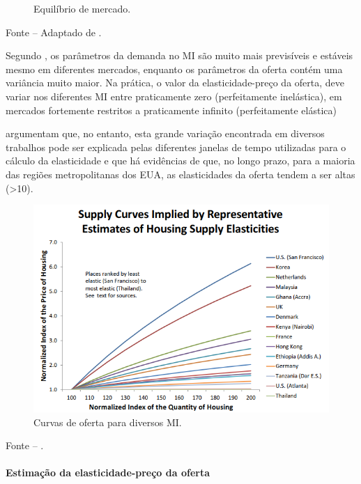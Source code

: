 \documentclass[
	12pt,				%
	oneside,			%
	a4paper,			%
	chapter=TITLE,		%
	section=TITLE,		%
	english,			%
	brazil				%
	]{abntex2}
\newcommand{\bcenter}{\begin{center}}
\newcommand{\ecenter}{\end{center}}
\begin{document}
\begin{refsection}
\begin{figure}[H]
{}

\caption{Equilíbrio de mercado.}\label{fig:casosEspeciais}
\end{figure}
\bcenter

\small Fonte -- Adaptado de \textcite[p.~312]{varian}.
\ecenter

Segundo \textcite[p.~17]{Malpezzi2002TheRO}, os parâmetros da demanda no \gls{MI} são
muito mais previsíveis e estáveis mesmo em diferentes mercados, enquanto os
parâmetros da oferta contém uma variância muito maior. Na prática, o valor da
elasticidade-preço da oferta, deve variar nos diferentes \gls{MI} entre
praticamente zero (perfeitamente inelástica), em mercados fortemente restritos
\autocite{malaysia} a praticamente infinito (perfeitamente elástica)

\textcite{supplyelasticity} argumentam que, no entanto, esta
grande variação encontrada em diversos trabalhos pode ser explicada pelas
diferentes janelas de tempo utilizadas para o cálculo da elasticidade e que há
evidências de que, no longo prazo, para a maioria das regiões metropolitanas dos
\gls{EUA}, as elasticidades da oferta tendem a ser altas (\textgreater10).
\begin{figure}[H]

{\centering \includegraphics[width=0.7\linewidth]{images/supplyCurves} 

}

\caption{Curvas de oferta para diversos \gls{MI}.}\label{fig:supplyCurves}
\end{figure}
\bcenter

\small Fonte -- \textcite[p.~19]{regulation}.
\ecenter

\hypertarget{estimauxe7uxe3o-da-elasticidade-preuxe7o-da-oferta}{%
\paragraph{Estimação da elasticidade-preço da oferta}\label{estimauxe7uxe3o-da-elasticidade-preuxe7o-da-oferta}}


\end{refsection}
\end{document}
